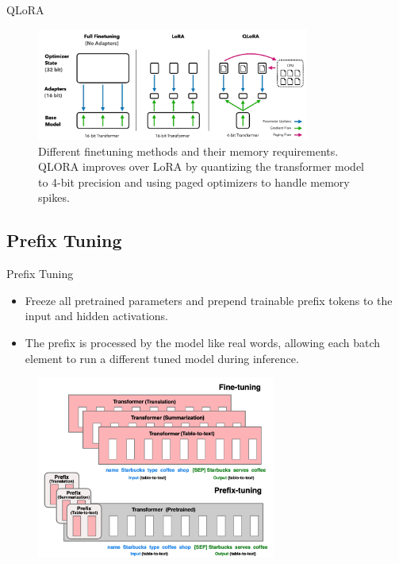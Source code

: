 \documentclass[serif, aspectratio=169]{beamer}
\begin{document}
\begin{frame}{QLoRA}
    \begin{figure}
        \centering
        \includegraphics[width=0.80\textwidth, height=0.70\textheight]{pic/QLoRA.PNG}
        \caption{Different finetuning methods and their memory requirements. QLORA improves over LoRA by quantizing the transformer model to 4-bit precision and using paged optimizers to handle memory spikes.}
    \end{figure}
\end{frame}

\subsection{Prefix Tuning}
\begin{frame}{Prefix Tuning}
    \begin{itemize}
        \item Freeze all pretrained parameters and prepend trainable prefix tokens to the input and hidden activations.
        \vspace{0.2cm}
        \item The prefix is processed by the model like real words, allowing each batch element to run a different tuned model during inference.
    \end{itemize}
    \begin{figure}
        \centering
        \includegraphics[width=0.7\textwidth, height=0.60\textheight]{pic/prefix-tuning.png}
    \end{figure}
\end{frame}
\end{document}
